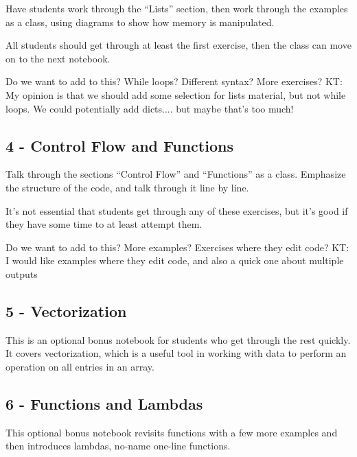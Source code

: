 \documentclass[11pt]{article}
\begin{document}
Have students work through the ``Lists'' section, then work through the examples as a class, using diagrams to show how memory is manipulated.

All students should get through at least the first exercise, then the class can move on to the next notebook.

{\color{red} Do we want to add to this? While loops? Different syntax? More exercises?  KT: My opinion is that we should add some selection for lists material, but not while loops. We could potentially add dicts.... but maybe that's too much!}

\subsection*{4 - Control Flow and Functions}

Talk through the sections ``Control Flow'' and ``Functions'' as a class. Emphasize the structure of the code, and talk through it line by line.

It's not essential that students get through any of these exercises, but it's good if they have some time to at least attempt them.

{\color{red} Do we want to add to this? More examples? Exercises where they edit code? KT: I would like examples where they edit code, and also a quick one about multiple outputs}

\subsection*{ 5 - Vectorization}

This is an optional bonus notebook for students who get through the rest quickly. It covers vectorization, which is a useful tool in working with data to perform an operation on all entries in an array. 

\subsection*{6 - Functions and Lambdas}

This optional bonus notebook revisits functions with a few more examples and then introduces lambdas, no-name one-line functions.
\end{document}

